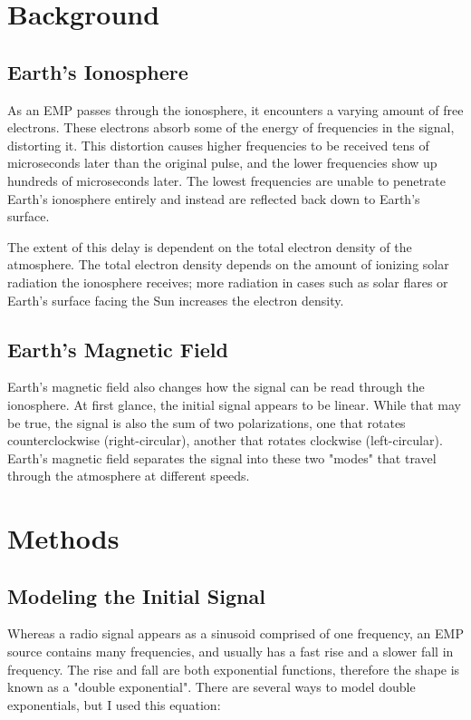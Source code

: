 \documentclass[12pt, reqno]{amsart}
\begin{document}

\section{Background}

\subsection{Earth's Ionosphere}

\noindent As an EMP passes through the ionosphere, it encounters a varying amount of free electrons. These electrons absorb some of the energy of frequencies in the signal, distorting it. This distortion causes higher frequencies to be received tens of microseconds later than the original pulse, and the lower frequencies show up hundreds of microseconds later. The lowest frequencies are unable to penetrate Earth's ionosphere entirely and instead are reflected back down to Earth's surface.

\noindent The extent of this delay is dependent on the total electron density of the atmosphere. The total electron density depends on the amount of ionizing solar radiation the ionosphere receives; more radiation in cases such as solar flares or Earth's surface facing the Sun increases the electron density.

\subsection{Earth's Magnetic Field}

\noindent Earth's magnetic field also changes how the signal can be read through the ionosphere. At first glance, the initial signal appears to be linear. While that may be true, the signal is also the sum of two polarizations, one that rotates counterclockwise (right-circular), another that rotates clockwise (left-circular). Earth's magnetic field separates the signal into these two "modes" that travel through the atmosphere at different speeds.


\section{Methods}

\subsection{Modeling the Initial Signal}
\noindent Whereas a radio signal appears as a sinusoid comprised of one frequency,
an EMP source contains many frequencies,  and usually has a fast rise and a slower fall in frequency. The rise and fall are both exponential functions, therefore the shape is known as a "double exponential". There are several ways to model double exponentials, but I used this equation:
\end{document}
